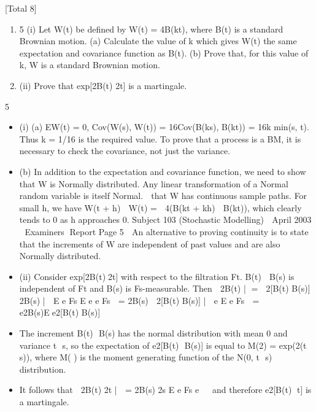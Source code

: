 \documentclass[a4paper,12pt]{article}
\begin{document}
[Total 8]
\begin{enumerate}
\item 5 (i) Let W(t) be defined by W(t) = 	4B(kt), where B(t) is a standard Brownian
motion.
(a) Calculate the value of k which gives W(t) the same expectation and
covariance function as B(t).
(b) Prove that, for this value of k, W is a standard Brownian motion.

\item 
(ii) Prove that exp[2B(t)	2t] is a martingale. 
\end{enumerate}

\newpage

5
\begin{itemize}
\item (i) (a) EW(t) = 0, Cov(W(s), W(t)) = 16Cov(B(ks), B(kt)) = 16k min(s, t).
Thus k = 1/16 is the required value.
To prove that a process is a BM, it is necessary to check the
covariance, not just the variance.
\item (b) In addition to the expectation and covariance function, we need to show
  that W is Normally distributed. Any linear transformation of a Normal random variable is itself Normal.
  that W has continuous sample paths. For small h, we have W(t + h)  W(t) =  4(B(kt + kh)  B(kt)), which clearly tends to 0
as h approaches 0.
Subject 103 (Stochastic Modelling)  April 2003  Examiners Report
Page 5
  An alternative to proving continuity is to state that the increments
of W are independent of past values and are also Normally
distributed.
\item (ii) Consider exp[2B(t)2t] with respect to the filtration Ft.
B(t)  B(s) is independent of Ft and B(s) is Fs-measurable. Then  2B(t) |  =  2[B(t) B(s)] 2B(s) | 
E e Fs E e e Fs 
= 2B(s)  2[B(t) B(s)] | 
e E e Fs 
= e2B(s)Ee2[B(t) B(s)]  
\item The increment B(t)  B(s) has the normal distribution with mean 0 and
variance t 	s, so the expectation of e2[B(t)  B(s)] is equal to M(2) = exp(2(t  s)), where M(
) is the moment generating function of the N(0, t  s) distribution.
\item It follows that
 2B(t) 2t |  = 2B(s) 2s
E e Fs e  
and therefore e2[B(t) t] is a martingale.
\end{itemize}
\end{document}
